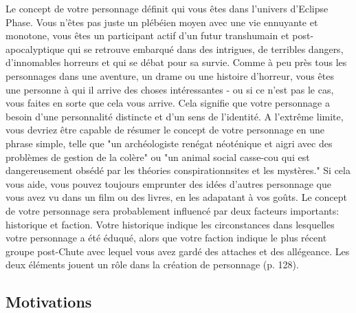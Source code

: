 Le concept de votre personnage définit qui vous êtes dans l'univers d'Eclipse Phase. Vous n'êtes pas juste un plébéien moyen avec une vie ennuyante et monotone, vous êtes un participant actif d'un futur transhumain et post-apocalyptique qui se retrouve embarqué dans des intrigues, de terribles dangers, d'innomables horreurs et qui se débat pour sa survie. Comme à peu près tous les personnages dans une aventure, un drame ou une histoire d'horreur, vous êtes une personne à qui il arrive des choses intéressantes - ou si ce n'est pas le cas, vous faites en sorte que cela vous arrive. Cela signifie que votre personnage a besoin d'une personnalité distincte et d'un sens de l'identité. A l'extrême limite, vous devriez être capable de résumer le concept de votre personnage en une phrase simple, telle que "un archéologiste renégat néoténique et aigri avec des problèmes de gestion de la colère" ou "un animal social casse-cou qui est dangereusement obsédé par les théories conspirationnsites et les mystères." Si cela vous aide, vous pouvez toujours emprunter des idées d'autres personnage que vous avez vu dans un film ou des livres, en les adapatant à vos goûts. Le concept de votre personnage sera probablement influencé par deux facteurs importants: historique et faction. Votre historique indique les circonstances dans lesquelles votre personnage a été éduqué, alors que votre faction indique le plus récent groupe post-Chute avec lequel vous avez gardé des attaches et des allégeance. Les deux éléments jouent un rôle dans la création de personnage (p. 128). 

\subsection{Motivations} \label{sec:motivations} 

